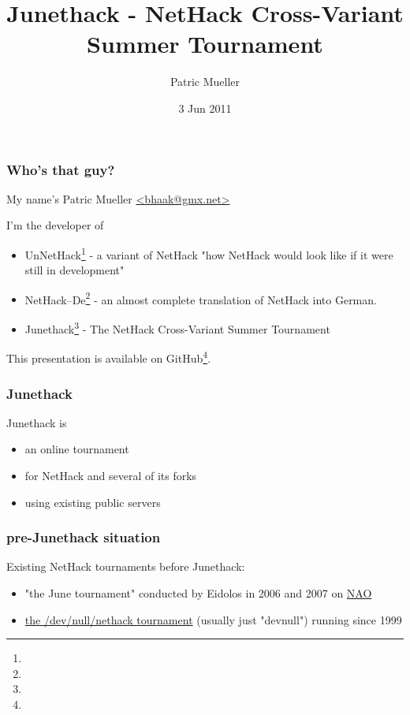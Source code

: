 \documentclass[handout]{beamer}
\title{Junethack - NetHack Cross-Variant Summer Tournament}
\author{Patric Mueller}
\date{3 Jun 2011}
\begin{document}
\begin{frame}
\titlepage
\end{frame}


\begin{frame}
\frametitle{Who's that guy?}
My name's Patric Mueller \href{mailto:bhaak@gmx.net}{<bhaak@gmx.net>} \pause

I'm the developer of \pause

  \begin{itemize}[<+->]
    \item UnNetHack\footnote{} - a variant of NetHack "how NetHack would look like if it were still in development"
    \item NetHack--De\footnote{} - an almost complete translation of NetHack into German.
    \item Junethack\footnote{} - The NetHack Cross-Variant Summer Tournament
  \end{itemize}\pause

  This presentation is available on GitHub\footnote{}.
\end{frame}

\begin{frame}
\frametitle{Junethack}
Junethack is
  \begin{itemize}
    \item an online tournament
    \item for NetHack and several of its forks
    \item using existing public servers
  \end{itemize}
\end{frame}

\begin{frame}
\frametitle{pre-Junethack situation}
  Existing NetHack tournaments before Junethack:\pause
  \begin{itemize}[<+->]
    \item "the June tournament" conducted by Eidolos in 2006 and 2007 on \href{http://nethack.alt.org/}{NAO}
    \item \href{http://nethack.devnull.net/}{the /dev/null/nethack tournament} (usually just "devnull") running since 1999
  \end{itemize}
\end{frame}
\end{document}

